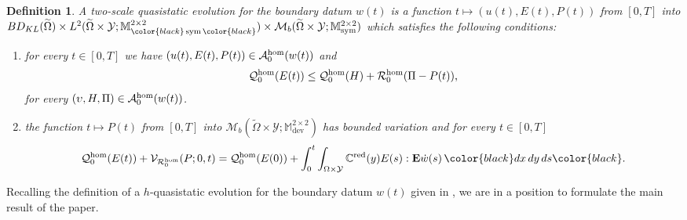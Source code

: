 \documentclass[reqno,10pt]{amsart}
\numberwithin{equation}{section}
\newtheorem{definition}[theorem]{Definition}
\theoremstyle{remark}
\newcommand{\RED}{\color{black}}
\newcommand{\BLACK}{\color{black}}
\newcommand{\PINK}{\color{black}}
\newcommand{\calA}{\mathcal{A}}
\newcommand{\C}{\mathbb{C}}
\newcommand{\M}{\mathbb{M}}
\newcommand{\calQ}{\mathcal{Q}}
\newcommand{\calR}{\mathcal{R}}
\newcommand{\calV}{\mathcal{V}}
\newcommand{\calY}{\mathcal{Y}}
\DeclareMathOperator{\dev}{dev}
\DeclareMathOperator{\sym}{sym}
\newcommand{\Mb}{\mathcal{M}_b}
\newcommand{\ext}[1]{\widetilde{#1}}
\newcommand{\E}{{\bf E}}
\newcommand{\red}[1]{#1^{\rm red}}
\begin{document}
\begin{definition} \label{two-scale quasistatic evolution}
A \emph{two-scale quasistatic evolution} for the boundary datum $w(t)$ is a function $t \mapsto (u(t), E(t), P(t))$ from $[0,T]$ into $BD_{KL}(\ext{\Omega}) \times L^2(\ext{\Omega} \times \calY;\M^{2 \times 2}_{{\RED\sym\BLACK}}) \times \Mb(\ext{\Omega} \times \calY;\M^{2 \times 2}_{\sym})$ which satisfies the following conditions:
\begin{enumerate}[label=(qs\arabic*)$^{\rm hom}_{0}$]
	\item \label{hom-qs S} for every $t \in [0,T]$ we have $(u(t), E(t), P(t)) \in \calA^{\rm hom}_{0}(w(t))$ and
	\begin{equation*}
		\calQ^{\rm hom}_{0}(E(t)) \leq \calQ^{\rm hom}_{0}(H) + \calR^{\rm hom}_{0}(\Pi-P(t)),
	\end{equation*}
	for every $(\upsilon,H,\Pi) \in \calA^{\rm hom}_{0}(w(t))$.
	\item \label{hom-qs E} the function $t \mapsto P(t)$ from $[0, T]$ into $\Mb(\ext{\Omega} \times \calY;\M^{2 \times 2}_{\dev})$ has bounded variation and for every $t \in [0, T]$
	\begin{equation*}
		\calQ^{\rm hom}_{0}(E(t)) + \calV_{\calR^{\rm hom}_{0}}(P; 0, t) = \calQ^{\rm hom}_{0}(E(0)) 
		+ \int_0^t \int_{\Omega \times \calY} \red{\C}(y) E(s) : {\E}\dot{w}(s) \,{\PINK dx\,dy\,ds\BLACK}.
	\end{equation*} 
\end{enumerate}
\end{definition}

Recalling the definition of a $h$-quasistatic evolution for the boundary datum $w(t)$ given in , we are in a position to formulate the main result of the paper.
\end{document}
